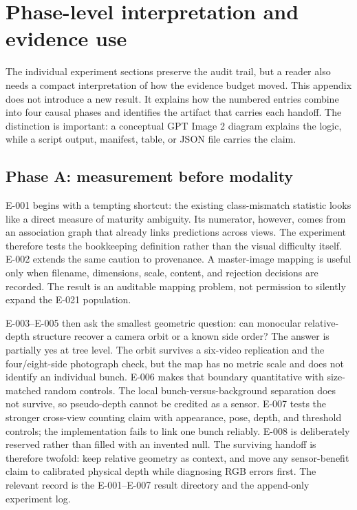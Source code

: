 \documentclass[preprint,12pt]{elsarticle}
\begin{document}
\appendix

\section{Phase-level interpretation and evidence use}
\label{app:phase-interpretation}
The individual experiment sections preserve the audit trail, but a reader also
needs a compact interpretation of how the evidence budget moved. This appendix
does not introduce a new result. It explains how the numbered entries combine
into four causal phases and identifies the artifact that carries each handoff.
The distinction is important: a conceptual GPT Image 2 diagram explains the
logic, while a script output, manifest, table, or JSON file carries the claim.

\subsection{Phase A: measurement before modality}
E-001 begins with a tempting shortcut: the existing class-mismatch statistic
looks like a direct measure of maturity ambiguity. Its numerator, however,
comes from an association graph that already links predictions across views.
The experiment therefore tests the bookkeeping definition rather than the
visual difficulty itself. E-002 extends the same caution to provenance. A
master-image mapping is useful only when filename, dimensions, scale, content,
and rejection decisions are recorded. The result is an auditable mapping
problem, not permission to silently expand the E-021 population.

E-003--E-005 then ask the smallest geometric question: can monocular
relative-depth structure recover a camera orbit or a known side order? The
answer is partially yes at tree level. The orbit survives a six-video
replication and the four/eight-side photograph check, but the map has no
metric scale and does not identify an individual bunch. E-006 makes that
boundary quantitative with size-matched random controls. The local
bunch-versus-background separation does not survive, so pseudo-depth cannot be
credited as a sensor. E-007 tests the stronger cross-view counting claim with
appearance, pose, depth, and threshold controls; the implementation fails to
link one bunch reliably. E-008 is deliberately reserved rather than filled
with an invented null. The surviving handoff is therefore twofold: keep
relative geometry as context, and move any sensor-benefit claim to calibrated
physical depth while diagnosing RGB errors first. The relevant record is the
E-001--E-007 result directory and the append-only experiment log.
\end{document}
